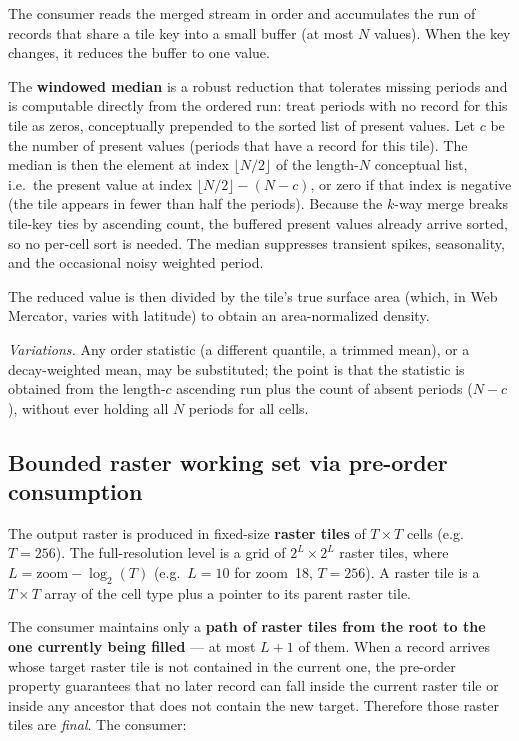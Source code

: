 \documentclass[10pt,twocolumn]{article}
\begin{document}
The consumer reads the merged stream in order and accumulates the run of
records that share a tile key into a small buffer (at most $N$ values).
When the key changes, it reduces the buffer to one value.

The \textbf{windowed median} is a robust reduction that tolerates missing
periods and is computable directly from the ordered run: treat periods with no
record for this tile as zeros, conceptually prepended to the sorted list of
present values. Let $c$ be the number of present values (periods that have
a record for this tile). The median is then the element at index
$\lfloor N/2 \rfloor$ of the length-$N$ conceptual list, i.e.\ the present value
at index $\lfloor N/2 \rfloor - (N - c)$, or zero if that index is negative
(the tile appears in fewer than half the periods). Because
the $k$-way merge breaks tile-key ties by ascending count, the buffered present
values already arrive sorted, so no per-cell sort is needed. The median
suppresses transient spikes, seasonality, and the occasional noisy weighted
period.

The reduced value is then divided by the tile's true surface area (which, in
Web Mercator, varies with latitude) to obtain an area-normalized density.

\emph{Variations.} Any order statistic (a different quantile, a trimmed mean),
or a decay-weighted mean, may be substituted; the point is that the statistic is
obtained from the length-$c$ ascending run plus the count of absent periods
($N - c$), without ever holding all $N$ periods for all cells.

\subsection{Bounded raster working set via pre-order consumption}

The output raster is produced in fixed-size \textbf{raster tiles} of
$T \times T$ cells (e.g.\ $T = 256$). The full-resolution level is a grid of
$2^{L} \times 2^{L}$ raster tiles, where $L = \text{zoom} - \log_2(T)$
(e.g.\ $L = 10$ for zoom~18, $T = 256$). A raster tile is a $T \times T$ array
of the cell type plus a pointer to its parent raster tile.

The consumer maintains only a \textbf{path of raster tiles from the root to the
one currently being filled} --- at most $L + 1$ of them. When a record arrives
whose target raster tile is not contained in the current one, the pre-order
property guarantees that no later record can fall inside the current raster
tile or inside any ancestor that does not contain the new target. Therefore
those raster tiles are \emph{final}. The consumer:
\end{document}
